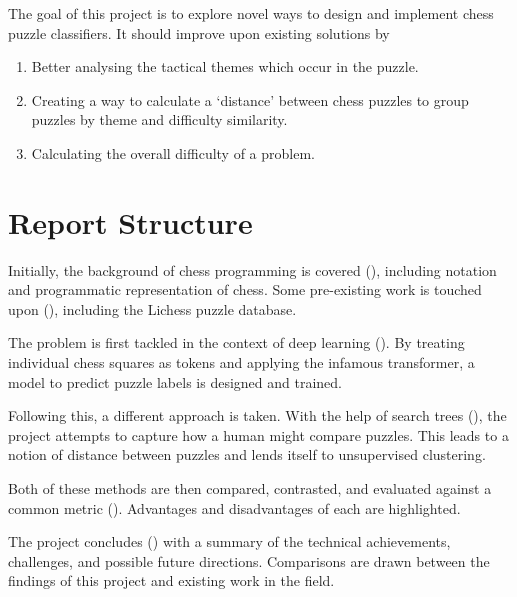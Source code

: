 The goal of this project is to explore novel ways to design and implement chess
puzzle classifiers. It should improve upon existing solutions by

\begin{enumerate}
    \item Better analysing the tactical themes which occur in the puzzle.
    \item Creating a way to calculate a `distance' between chess puzzles to 
    group puzzles by theme and difficulty similarity.
    \item Calculating the overall difficulty of a problem.
\end{enumerate}

\section{Report Structure}

Initially, the background of chess programming is covered
(), including notation and programmatic
representation of chess. Some pre-existing work is touched upon
(), including the Lichess puzzle database.

The problem is first tackled in the context of deep learning
(). By treating individual chess squares as tokens and
applying the infamous transformer, a model to predict puzzle labels is designed
and trained.

Following this, a different approach is taken. With the help of search trees
(), the project attempts to capture how a human might
compare puzzles. This leads to a notion of distance between puzzles and lends
itself to unsupervised clustering.

Both of these methods are then compared, contrasted, and evaluated against a
common metric (). Advantages and disadvantages of each
are highlighted.

The project concludes () with a summary of the
technical achievements, challenges, and possible future directions. Comparisons
are drawn between the findings of this project and existing work in the field.
